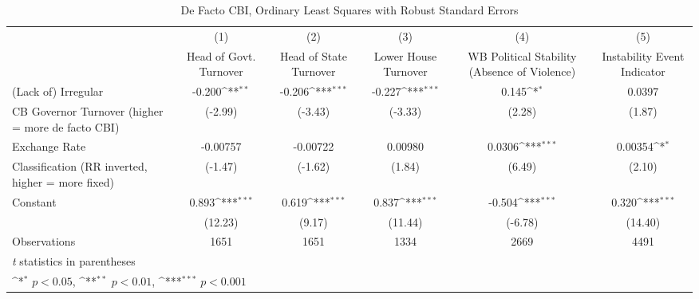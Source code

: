 \begin{table}[htbp]\centering
\def\sym#1{\ifmmode^{#1}\else\(^{#1}\)\fi}
\caption{De Facto CBI, Ordinary Least Squares with Robust Standard Errors \label{multIndOLSDJ}}
\begin{tabular}{l*{5}{c}}
\hline\hline
                    &\multicolumn{1}{c}{(1)}&\multicolumn{1}{c}{(2)}&\multicolumn{1}{c}{(3)}&\multicolumn{1}{c}{(4)}&\multicolumn{1}{c}{(5)}\\
                    &\multicolumn{1}{c}{Head of Govt. Turnover}&\multicolumn{1}{c}{Head of State Turnover}&\multicolumn{1}{c}{Lower House Turnover}&\multicolumn{1}{c}{WB Political Stability (Absence of Violence)}&\multicolumn{1}{c}{Instability Event Indicator}\\
\hline
(Lack of) Irregular &      -0.200\sym{**} &      -0.206\sym{***}&      -0.227\sym{***}&       0.145\sym{*}  &      0.0397         \\
CB Governor Turnover (higher = more de facto CBI)&     (-2.99)         &     (-3.43)         &     (-3.33)         &      (2.28)         &      (1.87)         \\
[1em]
Exchange Rate       &    -0.00757         &    -0.00722         &     0.00980         &      0.0306\sym{***}&     0.00354\sym{*}  \\
Classification (RR inverted, higher = more fixed)&     (-1.47)         &     (-1.62)         &      (1.84)         &      (6.49)         &      (2.10)         \\
[1em]
Constant            &       0.893\sym{***}&       0.619\sym{***}&       0.837\sym{***}&      -0.504\sym{***}&       0.320\sym{***}\\
                    &     (12.23)         &      (9.17)         &     (11.44)         &     (-6.78)         &     (14.40)         \\
\hline
Observations        &        1651         &        1651         &        1334         &        2669         &        4491         \\
\hline\hline
\multicolumn{6}{l}{\footnotesize \textit{t} statistics in parentheses}\\
\multicolumn{6}{l}{\footnotesize \sym{*} \(p<0.05\), \sym{**} \(p<0.01\), \sym{***} \(p<0.001\)}\\
\end{tabular}
\end{table}
